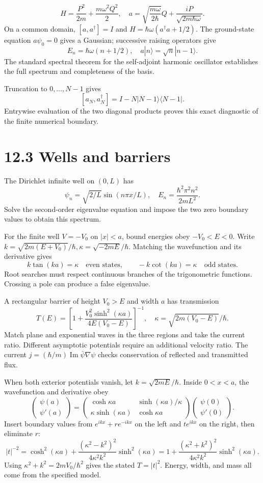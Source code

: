 \documentclass[
  11pt,
  oneside]{book}
\begin{document}
\[
H=\frac{P^2}{2m}+\frac{m\omega^2Q^2}{2},\quad
a=\sqrt{\frac{m\omega}{2\hbar}}Q+\frac{iP}{\sqrt{2m\hbar\omega}}.
\] On a common domain, \([a,a^\dagger]=I\) and
\(H=\hbar\omega(a^\dagger a+1/2)\). The ground-state equation
\(a\psi_0=0\) gives a Gaussian; successive raising operators give \[
E_n=\hbar\omega(n+1/2),\quad
a|n\rangle=\sqrt n|n-1\rangle.
\] The standard spectral theorem for the self-adjoint harmonic
oscillator establishes the full spectrum and completeness of the basis.

Truncation to \(0,\ldots,N-1\) gives \[
[a_N,a_N^\dagger]=I-N|N-1\rangle\langle N-1|.
\] Entrywise evaluation of the two diagonal products proves this exact
diagnostic of the finite numerical boundary.

\section{12.3 Wells and barriers}

The Dirichlet infinite well on \((0,L)\) has \[
\psi_n=\sqrt{2/L}\sin(n\pi x/L),\quad
E_n=\frac{\hbar^2\pi^2n^2}{2mL^2}.
\] Solve the second-order eigenvalue equation and impose the two zero
boundary values to obtain this spectrum.

For the finite well \(V=-V_0\) on \(|x|<a\), bound energies obey
\(-V_0<E<0\). Write
\(k=\sqrt{2m(E+V_0)}/\hbar,\kappa=\sqrt{-2mE}/\hbar\). Matching the
wavefunction and its derivative gives \[
k\tan(ka)=\kappa\quad\text{even states},\qquad
-k\cot(ka)=\kappa\quad\text{odd states}.
\] Root searches must respect continuous branches of the trigonometric
functions. Crossing a pole can produce a false eigenvalue.

A rectangular barrier of height \(V_0>E\) and width \(a\) has
transmission \[
T(E)=\left[1+
\frac{V_0^2\sinh^2(\kappa a)}{4E(V_0-E)}
\right]^{-1},\quad
\kappa=\sqrt{2m(V_0-E)}/\hbar.
\] Match plane and exponential waves in the three regions and take the
current ratio. Different asymptotic potentials require an additional
velocity ratio. The current
\(j=(\hbar/m)\operatorname{Im}\bar\psi\nabla\psi\) checks conservation
of reflected and transmitted flux.

When both exterior potentials vanish, let \(k=\sqrt{2mE}/\hbar\). Inside
\(0<x<a\), the wavefunction and derivative obey \[
\begin{pmatrix}\psi(a)\\\psi'(a)\end{pmatrix}
=\begin{pmatrix}\cosh\kappa a&\sinh(\kappa a)/\kappa\\
\kappa\sinh(\kappa a)&\cosh\kappa a\end{pmatrix}
\begin{pmatrix}\psi(0)\\\psi'(0)\end{pmatrix}.
\] Insert boundary values from \(e^{ikx}+re^{-ikx}\) on the left and
\(te^{ikx}\) on the right, then eliminate \(r\): \[
|t|^{-2}=\cosh^2(\kappa a)+
\frac{(\kappa^2-k^2)^2}{4\kappa^2k^2}\sinh^2(\kappa a)
=1+\frac{(\kappa^2+k^2)^2}{4\kappa^2k^2}\sinh^2(\kappa a).
\] Using \(\kappa^2+k^2=2mV_0/\hbar^2\) gives the stated \(T=|t|^2\).
Energy, width, and mass all come from the specified model.
\end{document}
